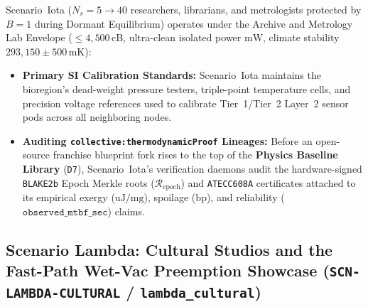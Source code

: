Scenario~Iota ($N_s = 5 \to 40$ researchers, librarians, and metrologists protected by $B=1$ during Dormant Equilibrium) operates under the Archive and Metrology Lab Envelope ($\le 4{,}500\,\mathrm{cB}$, ultra-clean isolated power $\mathrm{mW}$, climate stability $293{,}150 \pm 500\,\mathrm{mK}$):
\begin{itemize}
    \item \textbf{Primary SI Calibration Standards:} Scenario~Iota maintains the bioregion's dead-weight pressure testers, triple-point temperature cells, and precision voltage references used to calibrate Tier~1/Tier~2 Layer~2 sensor pods across all neighboring nodes.
    \item \textbf{Auditing \texttt{collective:thermodynamicProof} Lineages:} Before an open-source franchise blueprint fork rises to the top of the \textbf{Physics Baseline Library} (\texttt{D7}), Scenario~Iota's verification daemons audit the hardware-signed \texttt{BLAKE2b} Epoch Merkle roots ($\mathcal{R}_{\mathrm{epoch}}$) and \texttt{ATECC608A} certificates attached to its empirical exergy ($\mathrm{uJ/mg}$), spoilage ($\mathrm{bp}$), and reliability ($\mathtt{observed\_mtbf\_sec}$) claims.
\end{itemize}

\subsection{Scenario Lambda: Cultural Studios and the Fast-Path Wet-Vac Preemption Showcase (\texttt{SCN-LAMBDA-CULTURAL} / \texttt{lambda\_cultural})}

